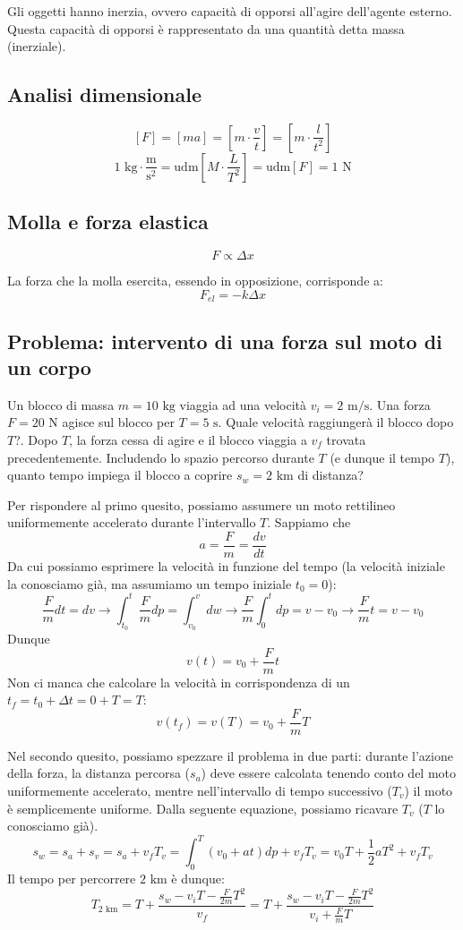 Gli oggetti hanno inerzia, ovvero capacità di opporsi all'agire dell'agente
esterno. Questa capacità di opporsi è rappresentato da una quantità detta
massa (inerziale).

\subsection{Analisi dimensionale}
\[ [F] = [ma] = \left[m\cdot\frac{v}{t}\right] = \left[m\cdot\frac{l}{t^2}\right]  \]
\[ 1\text{ kg}\cdot\frac{\text{m}}{\text{s}^2} = \text{udm}\left[M\cdot\frac{L}{T^2}\right] = \text{udm}[F] = 1\text{ N} \]


\subsection{Molla e forza elastica}
\[ F \propto \Delta x \]

La forza che la molla esercita, essendo in opposizione, corrisponde a:
\[ F_\textit{el} = -k\Delta x \]

\subsection*{Problema: intervento di una forza sul moto di un corpo}
Un blocco di massa $m = 10 \text{ kg}$ viaggia ad una velocità $v_i =
2 \text{ m/s}$. Una forza $F = 20 \text{ N}$ agisce sul blocco per
$T = 5 \text{ s}$. Quale velocità raggiungerà il blocco dopo $T$?.
Dopo $T$, la forza cessa di agire e il blocco viaggia a $v_f$ trovata
precedentemente. Includendo lo spazio percorso durante $T$ (e dunque il
tempo $T$), quanto tempo impiega il blocco a coprire $s_w = 2\text{ km}$
di distanza?

Per rispondere al primo quesito, possiamo assumere un moto rettilineo
uniformemente accelerato durante l'intervallo $T$. Sappiamo che \[ a = \frac{F}{m} = \frac{dv}{dt} \]
Da cui possiamo esprimere la velocità in funzione del tempo (la velocità
iniziale la conosciamo già, ma assumiamo un tempo iniziale $t_0 = 0$):
\[ \frac{F}{m}dt = dv \to \int_{t_0}^{t}\frac{F}{m}dp = \int_{v_0}^{v}dw \to \frac{F}{m}\int_{0}^{t}dp = v - v_0 \to \frac{F}{m}t = v - v_0 \]
Dunque
\[ v(t) = v_0 + \frac{F}{m}t \]
Non ci manca che calcolare la velocità in corrispondenza di un $t_f = t_0 + \Delta t = 0 + T = T$:
\[ v(t_f) = v(T) = v_0 + \frac{F}{m}T \]

Nel secondo quesito, possiamo spezzare il problema in due parti: durante
l'azione della forza, la distanza percorsa ($s_a$) deve essere calcolata tenendo
conto del moto uniformemente accelerato, mentre nell'intervallo di tempo
successivo ($T_v$) il moto è semplicemente uniforme. Dalla seguente equazione,
possiamo ricavare $T_v$ ($T$ lo conosciamo già).
\[ s_w = s_a + s_v = s_a + v_fT_v = \int_{0}^{T}(v_0 + at)dp + v_fT_v = v_0T + \frac{1}{2}aT^2 + v_fT_v \]
Il tempo per percorrere $2\text{ km}$ è dunque:
\[ T_{2\text{ km}} = T + \frac{s_w - v_iT - \frac{F}{2m}T^2}{v_f} = T + \frac{s_w - v_iT - \frac{F}{2m}T^2}{v_i + \frac{F}{m}T} \]

